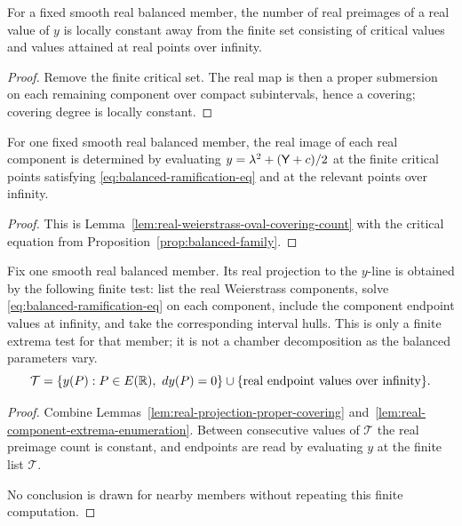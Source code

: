 \begin{lemma}\label{lem:real-projection-proper-covering}
For a fixed smooth real balanced member, the number of real preimages of a real value of $y$ is locally constant away from the finite set consisting of critical values and values attained at real points over infinity.
\end{lemma}
\begin{proof}
Remove the finite critical set.  The real map is then a proper submersion on each remaining component over compact subintervals, hence a covering; covering degree is locally constant.
\end{proof}

\begin{lemma}\label{lem:real-component-extrema-enumeration}
For one fixed smooth real balanced member, the real image of each real component is determined by evaluating $y=\lambda^2+(\mathsf{Y}+c)/2$ at the finite critical points satisfying \eqref{eq:balanced-ramification-eq} and at the relevant points over infinity.
\end{lemma}
\begin{proof}
This is Lemma~\ref{lem:real-weierstrass-oval-covering-count} with the critical equation from Proposition~\ref{prop:balanced-family}.
\end{proof}

\begin{lemma}\label{def:balanced-projection-datum}\label{prop:balanced-transition-support-reduction}\label{prop:balanced-projection-datum-complete}\label{prop:balanced-real-projection-fixed-extrema}\label{prop:balanced-real-projection}
Fix one smooth real balanced member.  Its real projection to the $y$-line is obtained by the following finite test: list the real Weierstrass components, solve \eqref{eq:balanced-ramification-eq} on each component, include the component endpoint values at infinity, and take the corresponding interval hulls.  This is only a finite extrema test for that member; it is not a chamber decomposition as the balanced parameters vary.
\begin{equation}\label{eq:balanced-real-extrema-set}
\mathcal T=\{y(P):P\in E(\mathbb{R}),\ dy(P)=0\}\cup\{\text{real endpoint values over infinity}\}.
\end{equation}
\end{lemma}
\begin{proof}
Combine Lemmas~\ref{lem:real-projection-proper-covering} and~\ref{lem:real-component-extrema-enumeration}.  Between consecutive values of $\mathcal T$ the real preimage count is constant, and endpoints are read by evaluating $y$ at the finite list $\mathcal T$.

No conclusion is drawn for nearby members without repeating this finite computation.\label{rem:balanced-projection-reading}\label{rem:balanced-finite-comparison-algorithm}\label{rem:balanced-real-interval-alternatives}\label{rem:balanced-fixed-criterion-complete}\label{cor:fixed-member-projection-comparison}
\end{proof}

